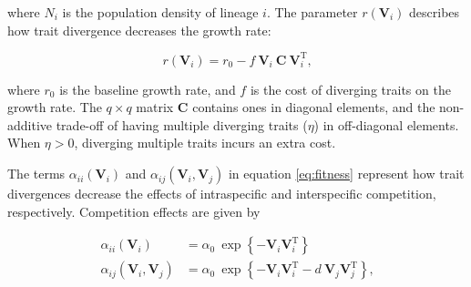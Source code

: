 \noindent where $N_i$ is the population density of  lineage $i$.
The parameter $r(\mathbf{V}_i)$ describes how trait divergence decreases the growth rate:

\begin{equation} \label{eq:growth-rate}
    r(\mathbf{V}_i) = r_0 - f ~ \mathbf{V}_i ~ \mathbf{C} ~ \mathbf{V}_{i}^{\textrm{T}}
    \textrm{,}
\end{equation}

\noindent where $r_0$ is the baseline growth rate, and
$f$ is the cost of diverging traits on the growth rate.
The $q \times q$ matrix $\mathbf{C}$ contains ones in diagonal elements, and the
non-additive trade-off of having multiple diverging traits ($\eta$) in off-diagonal
elements.
When $\eta > 0$, diverging multiple traits incurs an extra cost.


%
%


The terms $\alpha_{ii}(\mathbf{V}_i)$ and $\alpha_{ij}(\mathbf{V}_i, \mathbf{V}_j)$
in equation \ref{eq:fitness} represent how trait divergences decrease the effects
of intraspecific and interspecific competition, respectively.
Competition effects are given by

\begin{equation} \label{eq:competition}
\begin{split}
    \alpha_{ii}(\mathbf{V}_i) &= \alpha_0 ~\exp \left\{- \mathbf{V}_i
        \mathbf{V}_i^{\textrm{T}} \right\} \\
    \alpha_{ij}(\mathbf{V}_i, \mathbf{V}_j) &= \alpha_0 ~\exp \left\{
        - \mathbf{V}_i \mathbf{V}_i^{\textrm{T}} -
        d ~ \mathbf{V}_j \mathbf{V}_j^{\textrm{T}} \right\}
	\textrm{,}
\end{split}
\end{equation}

